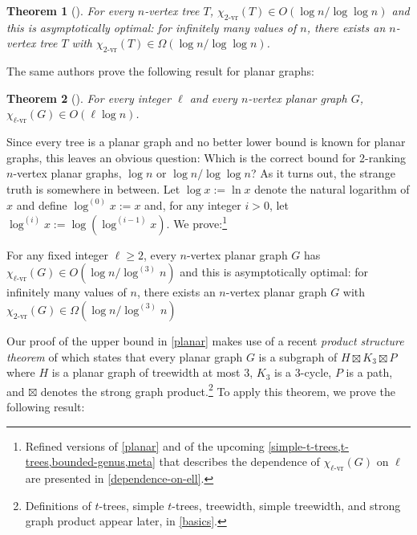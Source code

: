 \documentclass[kpfonts]{patmorin}
\newcommand{\defin}[1]{\emph{\color{brightmaroon}#1}}
\newcommand{\rn}[1]{\chi_{\operatorname{#1-vr}}}
\newcommand{\trn}{\rn{2}}
\newcommand{\lrn}{\rn{\ell}}
\newtheorem{othertheorem}{Theorem}
\theoremstyle{named}
\begin{document}
\setcounter{othertheorem}{19}
\begin{othertheorem}[\cite{karpas.neiman.ea:on}]\label{trees}
    For every $n$-vertex tree $T$, $\trn(T)\in O(\log n/\log\log n)$ and this is asymptotically optimal: for infinitely many values of $n$, there exists an $n$-vertex tree $T$ with $\trn(T)\in\Omega(\log n/\log\log n)$.
\end{othertheorem}

The same authors prove the following result for planar graphs:

\setcounter{othertheorem}{15}
\begin{othertheorem}[\cite{karpas.neiman.ea:on}]\label{planar-graphs}
    For every integer $\ell$ and every $n$-vertex planar graph $G$, $\lrn(G)\in O(\ell\log n)$.
\end{othertheorem}

Since every tree is a planar graph and no better lower bound is known for planar graphs, this leaves an obvious question:  Which is the correct bound for 2-ranking $n$-vertex planar graphs, $\log n$ or $\log n/\log\log n$?  As it turns out, the strange truth is somewhere in between.  Let $\log x :=\ln x$ denote the natural logarithm of $x$ and define $\log^{(0)}x:=x$ and, for any integer $i>0$, let $\log^{(i)}x:=\log(\log^{(i-1)} x)$. We prove:\footnote{Refined versions of \cref{planar} and of the upcoming \cref{simple-t-trees,t-trees,bounded-genus,meta} that describes the dependence of $\lrn(G)$ on $\ell$ are presented in \cref{dependence-on-ell}.}


\begin{thm}\label{planar}
    For any fixed integer $\ell\ge 2$, every $n$-vertex planar graph $G$ has $\lrn(G)\in O(\log n/\log^{(3)} n)$ and this is asymptotically optimal: for infinitely many values of $n$, there exists an $n$-vertex planar graph $G$ with $\trn(G)\in \Omega(\log n/\log^{(3)} n)$
\end{thm}


Our proof of the upper bound in \cref{planar} makes use of a recent \defin{product structure theorem} of \citet{dujmovic.joret.ea:planar} which states that every planar graph $G$ is a subgraph of $H\boxtimes K_3\boxtimes P$ where $H$ is a planar graph of treewidth at most $3$, $K_3$ is a 3-cycle, $P$ is a path, and $\boxtimes$ denotes the strong graph product.\footnote{Definitions of $t$-trees, simple $t$-trees, treewidth, simple treewidth, and strong graph product appear later, in \cref{basics}.}  To apply this theorem, we prove the following result:
\end{document}

